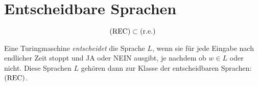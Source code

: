 \chapter{Entscheidbare Sprachen}
\begin{equation*}
	\mathrm{(REC)}\subset\mathrm{(r.e.)}
\end{equation*}

Eine Turingmaschine \emph{entscheidet} die Sprache $L$, wenn sie für jede Eingabe nach endlicher Zeit stoppt und JA oder NEIN ausgibt, je nachdem ob $w\in L$ oder nicht.
Diese Sprachen $L$ gehören dann zur Klasse der entscheidbaren Sprachen: $\mathrm{(REC)}$.
